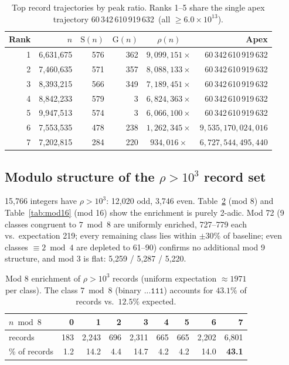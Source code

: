 \documentclass[11pt]{article}
\theoremstyle{remark}
\newcommand{\rankOneApex}{60\,342\,610\,919\,632}
\begin{document}
\begin{table}[t]
\centering
\small
\begin{tabular}{@{}rrrrcr@{}}
\toprule
Rank & $n$ & $\mathrm{S}(n)$ & $\mathrm{G}(n)$ & $\rho(n)$ & Apex \\
\midrule
1 & 6{,}631{,}675 & 576 & 362 & $9{,}099{,}151\times$ & \rankOneApex \\
2 & 7{,}460{,}635 & 571 & 357 & $8{,}088{,}133\times$ & \rankOneApex \\
3 & 8{,}393{,}215 & 566 & 349 & $7{,}189{,}451\times$ & \rankOneApex \\
4 & 8{,}842{,}233 & 579 & 3   & $6{,}824{,}363\times$ & \rankOneApex \\
5 & 9{,}947{,}513 & 574 & 3   & $6{,}066{,}100\times$ & \rankOneApex \\
6 & 7{,}553{,}535 & 478 & 238 & $1{,}262{,}345\times$ & $9{,}535{,}170{,}024{,}016$ \\
7 & 7{,}202{,}815 & 284 & 220 & $934{,}016\times$   & $6{,}727{,}544{,}495{,}440$ \\
\bottomrule
\end{tabular}
\caption{Top record trajectories by peak ratio. Ranks 1--5 share the single
apex trajectory \rankOneApex\ (all $\ge 6.0 \times 10^{13}$).}
\label{tab:top5}
\end{table}

\subsection{Modulo structure of the \texorpdfstring{$\rho > 10^{3}$}{rho > 1000} record set}
\label{sec:mod}
15{,}766 integers have $\rho > 10^3$: 12{,}020 odd, 3{,}746 even.
Table~\ref{tab:mod8} (mod 8) and Table~\ref{tab:mod16} (mod 16) show the
enrichment is purely 2-adic. Mod 72 (9 classes congruent to $7 \bmod 8$ are
uniformly enriched, 727--779 each vs.\ expectation 219; every remaining
class lies within $\pm 30\%$ of baseline; even classes $\equiv 2 \bmod 4$
are depleted to 61--90) confirms no additional mod 9 structure, and mod 3
is flat: 5{,}259 / 5{,}287 / 5{,}220.

\begin{table}[t]
\centering
\begin{tabular}{@{}lrrrrrrrr@{}}
\toprule
$n \bmod 8$ & 0 & 1 & 2 & 3 & 4 & 5 & 6 & 7 \\
\midrule
records & 183 & 2{,}243 & 696 & 2{,}311 & 665 & 665 & 2{,}202 & 6{,}801 \\
\% of records & 1.2 & 14.2 & 4.4 & 14.7 & 4.2 & 4.2 & 14.0 & \textbf{43.1} \\
\bottomrule
\end{tabular}
\caption{Mod 8 enrichment of $\rho > 10^3$ records (uniform expectation
$\approx 1971$ per class). The class $7 \bmod 8$ (binary $\texttt{...111}$)
accounts for $43.1\%$ of records vs.\ $12.5\%$ expected.}
\label{tab:mod8}
\end{table}
\end{document}
